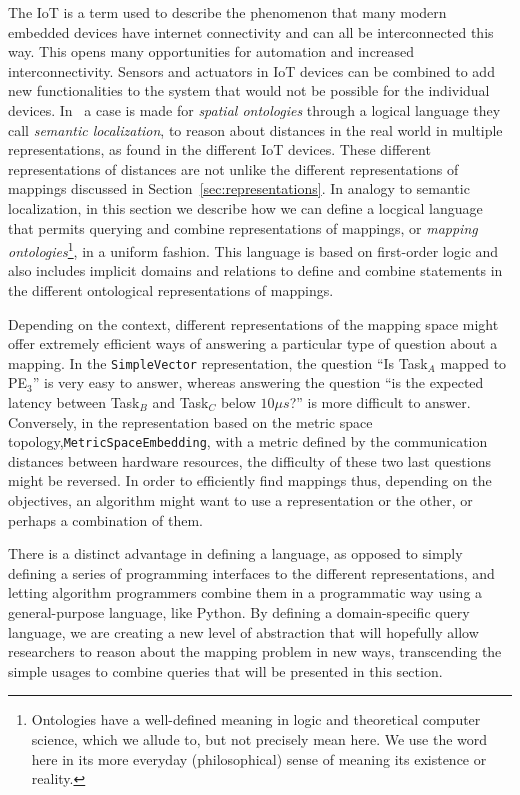 The \acf{IoT} is a term used to describe the phenomenon that many modern embedded devices have internet connectivity and can all be interconnected this way.
This opens many opportunities for automation and increased interconnectivity. 
Sensors and actuators in \ac{IoT} devices can be combined to add new functionalities to the system that would not be possible for the individual devices.
In~\cite{weber_phdthesis} a case is made for \emph{spatial ontologies} through a logical language they call \emph{semantic localization}, to reason about distances in the real world in multiple representations, as found in the different \ac{IoT} devices.
These different representations of distances are not unlike the different representations of mappings discussed in Section~\ref{sec:representations}.
In analogy to semantic localization, in this section we describe how we can define a locgical language that permits querying and combine representations of mappings, or \emph{mapping ontologies}\footnote{Ontologies have a well-defined meaning in logic and theoretical computer science, which we allude to, but not precisely mean here. We use the word here in its more everyday (philosophical) sense of meaning its existence or reality.}, in a uniform fashion.
This language is based on first-order logic and also includes implicit domains and relations to define and combine statements in the different ontological representations of mappings.

Depending on the context, different representations of the mapping space might offer extremely efficient ways of answering a particular type of question about a mapping.
In the \texttt{SimpleVector} representation, the question ``Is Task$_A$ mapped to PE$_3$'' is very easy to answer, whereas answering the question ``is the expected latency between Task$_B$ and Task$_C$ below $10 \mu s$?'' is more difficult to answer.
Conversely, in the representation based on the metric space topology,\texttt{MetricSpaceEmbedding}, with a metric defined by the communication distances between hardware resources, the difficulty of these two last questions might be reversed.
In order to efficiently find mappings thus, depending on the objectives, an algorithm might want to use a representation or the other, or perhaps a combination of them.

There is a distinct advantage in defining a language, as opposed to simply defining a series of programming interfaces to the different representations, and letting algorithm programmers combine them in a programmatic way using a general-purpose language, like Python.
By defining a domain-specific query language, we are creating a new level of abstraction that will hopefully allow researchers to reason about the mapping problem in new ways, transcending the simple usages to combine queries that will be presented in this section.

